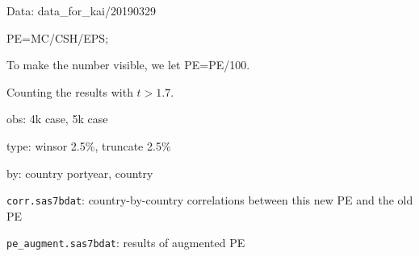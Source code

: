 

\usepackage[T1]{fontenc}




\thispagestyle{fancy}

\newcommand{\code}{\texttt}
\newcommand*{\Commonpath}{20190401}

Data: data\_for\_kai/20190329

PE=MC/CSH/EPS;

To make the number visible, we let PE=PE/100.

Counting the results with $t>1.7$.

obs: 4k case, 5k case

type: winsor 2.5\%, truncate 2.5\%

by: country portyear, country




\code{corr.sas7bdat}: country-by-country correlations between this new PE and the old PE

\code{pe\_augment.sas7bdat}: results of augmented PE


